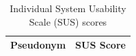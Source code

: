 \begin{table}[htbp]
\centering
\caption{Individual System Usability Scale (SUS) scores}
\label{tab:sus_scores}
\begin{tabular}{ll}
\toprule
Pseudonym & SUS Score \\
\midrule
\bottomrule
\end{tabular}
\end{table}
